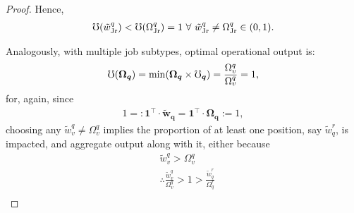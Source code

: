 \documentclass[hidelinks, nonatbib]{elsarticle}
\begin{document}
\begin{lemma}
\begin{proof}
        Hence, 
        \begin{gather}
            \mho(\tilde{w}_{\text{Jr}}^{q}) < 
            \mho(\Omega_{\text{Jr}}^{q}) 
            = 1
            \
            \forall
            \
            \tilde{w}_{\text{Jr}}^{q}
            \neq
            \Omega_{\text{Jr}}^{q}
            \in 
            (0,1)
            .
        \end{gather}
        
        Analogously, with multiple job subtypes, optimal operational output is:
        \begin{gather}
            \mho(\boldsymbol{\Omega_q})
            = 
            \min(
                \boldsymbol{\Omega_q}
                \times
                \boldsymbol{\mho_q}
            )
            =
            \frac{
                \Omega_{v}^{q}
            }{
                \Omega_{v}^{q}
            }
            =
            1
            ,
        \end{gather}
        for, again, since
        \begin{gather}
            1
            =:
            \boldsymbol{1} ^ {\top}
            \cdot
            \boldsymbol{\tilde{w}_{q}}
            =
            \boldsymbol{1} ^ {\top}
            \cdot
            \boldsymbol{\Omega_{q}}
            := 1
            ,
        \end{gather}
        choosing any $\tilde{w}_{v}^{q} \neq \Omega_{v}^{q}$ implies the proportion of at least one position, say $\tilde{w}_{q}^{r}$, is impacted, and aggregate output along with it, either because
        \begin{align}
            &
            \tilde{w}_{v}^{q} > \Omega_{v}^{q}
            \\
            &\therefore
            \frac{
                \tilde{w}_{v}^{q}
            }{
                \Omega_{v}^{q}
            }
            > 
            1
            > 
            \frac{
                \tilde{w}_{q}^{r}
            }{
                \Omega_{q}^{r}
            }
            \\

\end{align}
\end{proof}
\end{lemma}
\end{document}

